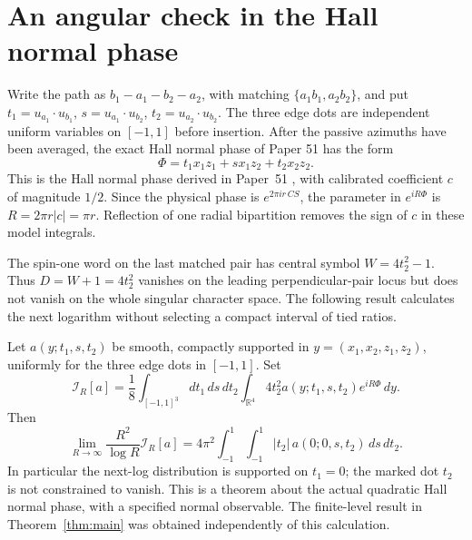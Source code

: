 \appendix
\section{An angular check in the Hall normal phase}
\label{sec:p4-next-log-model}

Write the path as $b_1-a_1-b_2-a_2$, with matching
$\{a_1b_1,a_2b_2\}$, and put
$t_1=u_{a_1}\cdot u_{b_1}$, $s=u_{a_1}\cdot u_{b_2}$,
$t_2=u_{a_2}\cdot u_{b_2}$.
The three edge dots are independent uniform variables on $[-1,1]$
before insertion.  After the passive azimuths have been averaged,
the exact Hall normal phase of Paper 51 has the form
\[
 \Phi=t_1x_1z_1+s x_1z_2+t_2x_2z_2.
\]
This is the Hall normal phase derived in Paper~51 \cite{p51}, with calibrated coefficient $c$ of magnitude $1/2$.
Since the physical phase is $e^{2\pi i r\,CS}$,
the parameter in $e^{iR\Phi}$ is $R=2\pi r|c|=\pi r$.
Reflection of one radial bipartition removes
the sign of $c$ in these model integrals.

The spin-one word on the last matched pair has central symbol
$W=4t_2^2-1$.  Thus $D=W+1=4t_2^2$ vanishes on the leading
perpendicular-pair locus but does not vanish on the whole singular
character space.  The following result calculates the next logarithm
without selecting a compact interval of tied ratios.

\begin{proposition}
Let $a(y;t_1,s,t_2)$ be smooth, compactly supported in
$y=(x_1,x_2,z_1,z_2)$, uniformly for the three edge dots in $[-1,1]$.
Set
\[
 \mathcal I_R[a]=\frac18\int_{[-1,1]^3}\!dt_1\,ds\,dt_2
       \int_{\mathbb R^4}4t_2^2 a(y;t_1,s,t_2)e^{iR\Phi}\,dy.
\]
Then
\[
 \boxed{\quad
 \lim_{R\to\infty}\frac{R^2}{\log R}\mathcal I_R[a]
   =4\pi^2\int_{-1}^1\!\int_{-1}^1
          |t_2|\,a(0;0,s,t_2)\,ds\,dt_2 .\quad}
\]
In particular the next-log distribution is supported on $t_1=0$;
the marked dot $t_2$ is not constrained to vanish.  This is a theorem
about the actual quadratic Hall normal phase, with a specified normal
observable.  The finite-level result in Theorem~\ref{thm:main} was obtained independently of this calculation.
\end{proposition}

